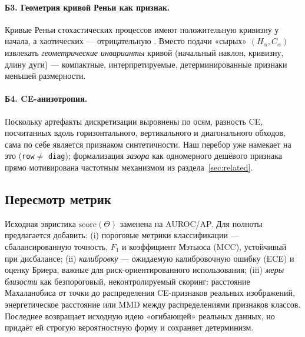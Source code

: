 \documentclass[14pt]{extarticle}
\theoremstyle{plain}
\numberwithin{equation}{section}
\numberwithin{figure}{section}
\numberwithin{table}{section}
\begin{document}
\paragraph{Б3. Геометрия кривой Реньи как признак.}
Кривые Реньи стохастических процессов имеют положительную кривизну у начала, а
хаотических — отрицательную \citep{RePEc:eee:phsmap:v:498:y:2018:i:c:p:74-85}.
Вместо подачи «сырых» $(H_\alpha,C_\alpha)$ извлекать \emph{геометрические
инварианты} кривой (начальный наклон, кривизну, длину дуги) — компактные,
интерпретируемые, детерминированные признаки меньшей размерности.

\paragraph{Б4. CE-анизотропия.}
Поскольку артефакты дискретизации выровнены по осям, разность CE, посчитанных вдоль
горизонтального, вертикального и диагонального обходов, сама по себе является
признаком синтетичности. Наш перебор уже намекает на это (\texttt{row}$\neq$%
\texttt{diag}); формализация \emph{зазора} как одномерного дешёвого признака
прямо мотивирована частотным механизмом из раздела~\ref{sec:related}.

\subsection{Пересмотр метрик}\label{sec:metrics}
Исходная эвристика $\text{score}(\Theta)$ заменена на AUROC/AP. Для полноты
предлагается добавить: (i) пороговые метрики классификации — сбалансированную
точность, $F_1$ и коэффициент Мэтьюса (MCC), устойчивый при дисбалансе; (ii)
\emph{калибровку} — ожидаемую калибровочную ошибку (ECE) и оценку Бриера, важные
для риск-ориентированного использования; (iii) \emph{меры близости} как
безпороговый, неконтролируемый скоринг: расстояние Махаланобиса от точки до
распределения CE-признаков реальных изображений, энергетическое расстояние или
MMD между распределениями признаков классов. Последнее возвращает исходную идею
«огибающей» реальных данных, но придаёт ей строгую вероятностную форму и
сохраняет детерминизм.

\end{document}
